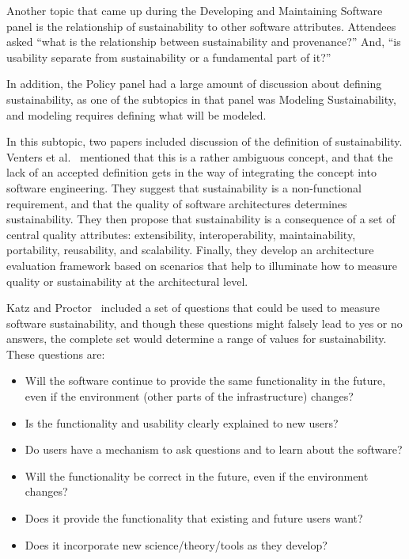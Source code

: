 \documentclass[11pt, oneside]{amsart}
\begin{document}
Another topic that came up during the Developing and Maintaining Software panel
is the relationship of sustainability to other software attributes.  Attendees
asked ``what is the relationship between sustainability and provenance?'' And,
``is usability separate from sustainability or a fundamental part of it?''

In addition, the Policy panel had a large amount of discussion about defining
sustainability, as one of the subtopics in that panel was Modeling
Sustainability, and modeling requires defining what will be modeled.

In this subtopic, two papers included discussion of the definition of
sustainability.  Venters et al.~\cite{Venters_WSSSPE} mentioned that this is a
rather ambiguous concept, and that the lack of an accepted definition gets in
the way of integrating the concept into software engineering. They suggest that
sustainability is a non-functional requirement, and that the quality of
software architectures determines sustainability. They then propose that
sustainability is a consequence of a set of central quality attributes:
extensibility, interoperability, maintainability, portability, reusability, and
scalability. Finally, they develop an architecture evaluation framework based
on scenarios that help to illuminate how to measure quality or sustainability
at the architectural level.

Katz and Proctor~\cite{Katz_WSSSPE} included a set of questions that could be
used to measure software sustainability, and though these questions might
falsely lead to yes or no answers, the complete set would determine a range of
values for sustainability. These questions are:
\begin{itemize}
\item Will the software continue to provide the same functionality in the future,
      even if the environment (other parts of the infrastructure) changes?
\item Is the functionality and usability clearly explained to new users?
\item Do users have a mechanism to ask questions and to learn about the software?
\item Will the functionality be correct in the future, even if the environment changes?
\item Does it provide the functionality that existing and future users want?
\item Does it incorporate new science/theory/tools as they develop?
\end{itemize}
\end{document}
